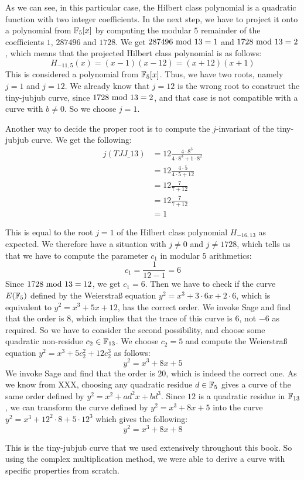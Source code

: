 \begin{example}
As we can see, in this particular case, the Hilbert class polynomial is a quadratic function with two integer coefficients. In the next step, we have to project it onto a polynomial from $\mathbb{F}_5[x]$ by computing the modular $5$ remainder of the coefficients $1$, $287496$ and $1728$. We get $287496 \text{ mod } 13=1$ and $1728 \text{ mod } 13=2$, which means that the projected Hilbert class polynomial is as follows:
$$
H_{-11,5}(x)=(x-1)(x-12)= (x+12)(x+1)
$$ 
This is considered a polynomial from $\mathbb{F}_5[x]$. Thus, we have two roots, namely $j=1$ and $j=12$. We already know that $j=12$ is the wrong root to construct the tiny-jubjub curve, since $1728 \text{ mod } 13=2$, and that case is not compatible with a curve with $b\neq 0$. So we choose $j=1$.

Another way to decide the proper root is to compute the $j$-invariant of the tiny-jubjub curve. We get the following:
\begin{align*}
j(\mathit{TJJ\_13}) & = 12\frac{4\cdot 8^3}{4\cdot 8^3+ 1\cdot 8^2}\\
                    & = 12\frac{4\cdot 5}{4\cdot 5+ 12}\\
                    & = 12\frac{7}{7+ 12}\\
                    & = 12\frac{7}{7+ 12}\\
                    & = 1
\end{align*}

This is equal to the root $j=1$ of the Hilbert class polynomial $H_{-16,13}$ as expected. We therefore have a situation with $j\neq 0$ and $j\neq 1728$, which tells us that we have to compute the parameter $c_1$ in modular $5$ arithmetics:
$$
c_1=\frac{1}{12-1} = 6
$$
Since $1728 \text{ mod } 13=12$, we get $c_1=6$. Then we have to check if the curve $E(\mathbb{F}_5)$ defined by the Weierstraß  equation $y^2 = x^3 + 3\cdot 6 x + 2\cdot 6$, which is equivalent to
$
y^2 = x^3 + 5x +12
$, has the correct order. We invoke Sage and find that the order is $8$, which implies that the trace of this curve is $6$, not $-6$ as required. So we have to consider the second possibility, and choose some quadratic non-residue $c_2\in\mathbb{F}_{13}$. We choose $c_2=5$ and compute the Weierstraß equation $y^2 = x^3 + 5 c_2^2 + 12 c_2^3$ as follows:
$$
y^2 = x^3 + 8 x + 5
$$
We invoke Sage and find that the order is $20$, which is indeed the correct one. As we know from XXX, choosing any quadratic residue $d\in \mathbb{F}_5$ gives a curve of the same order defined by $y^2 = x^2 + a d^2 x + bd^3$. Since $12$ is a quadratic residue in $\mathbb{F}_{13}$, we can transform the curve defined by 
$y^2 = x^3 +8x+5$ into the curve $y^2 = x^3 + 12^2\cdot 8 + 5\cdot 12^3$ which gives the following:
$$
y^2 = x^3 + 8x +8
$$

This is the tiny-jubjub curve that we used extensively throughout this book. So using the complex multiplication method, we were able to derive a curve with specific properties from scratch.
\end{example}

